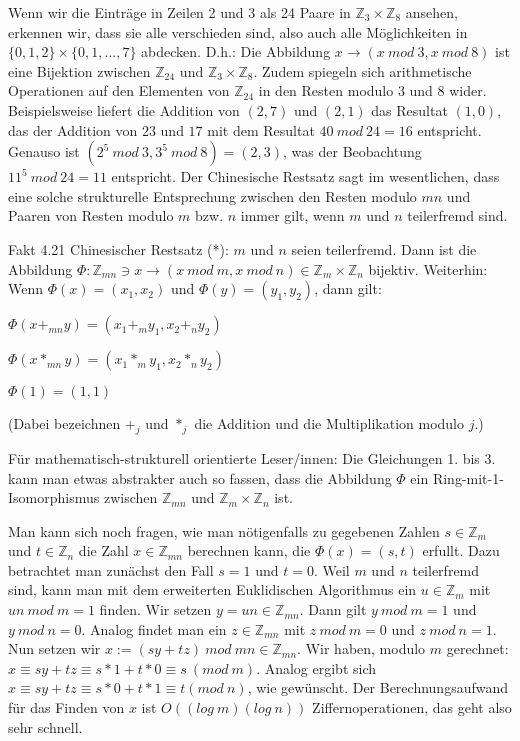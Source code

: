 \documentclass[a4paper]{article}
\begin{document}
\begin{multicols}{3}
    Wenn wir die Einträge in Zeilen 2 und 3 als 24 Paare in $\mathbb{Z}_3 \times\mathbb{Z}_8$ ansehen, erkennen wir, dass sie alle verschieden sind, also auch alle Möglichkeiten in $\{0,1,2\}\times\{0,1,...,7\}$ abdecken. D.h.: Die Abbildung $x\rightarrow (x\ mod\ 3,x\ mod\ 8)$ ist eine Bijektion zwischen $\mathbb{Z}_{24}$ und $\mathbb{Z}_3\times\mathbb{Z}_8$. Zudem spiegeln sich arithmetische Operationen auf den Elementen von $\mathbb{Z}_{24}$ in den Resten modulo $3$ und $8$ wider. Beispielsweise liefert die Addition von $(2,7)$ und $(2,1)$ das Resultat $(1,0)$, das der Addition von $23$ und $17$ mit dem Resultat $40\ mod\ 24 = 16$ entspricht. Genauso ist $(2^5\ mod\ 3, 3^5\ mod\ 8)=(2,3)$, was der Beobachtung $11^5\ mod\ 24 = 11$ entspricht.
    Der Chinesische Restsatz sagt im wesentlichen, dass eine solche strukturelle Entsprechung zwischen den Resten modulo $mn$ und Paaren von Resten modulo $m$ bzw. $n$ immer gilt, wenn $m$ und $n$ teilerfremd sind.

    Fakt 4.21 Chinesischer Restsatz (*): $m$ und $n$ seien teilerfremd. Dann ist die Abbildung $\Phi:\mathbb{Z}_{mn} \owns x \rightarrow (x\ mod\ m, x\ mod\ n)\in\mathbb{Z}_m\times\mathbb{Z}_n$ bijektiv. Weiterhin: Wenn $\Phi(x)=(x_1,x_2)$ und $\Phi(y)=(y_1,y_2)$, dann gilt:
    \begin{enumerate*}
        \item $\Phi(x+_{mn} y) = (x_1 +_m y_1 , x_2 +_n y_2)$
        \item $\Phi(x*_{mn} y) = (x_1 *_m y_1 , x_2 *_n y_2)$
        \item $\Phi(1) = (1,1)$
    \end{enumerate*}

    (Dabei bezeichnen $+_j$ und $*_j$ die Addition und die Multiplikation modulo $j$.)

    Für mathematisch-strukturell orientierte Leser/innen: Die Gleichungen 1. bis 3. kann man etwas abstrakter auch so fassen, dass die Abbildung $\Phi$ ein Ring-mit-1-Isomorphismus zwischen $\mathbb{Z}_{mn}$ und $\mathbb{Z}_m \times\mathbb{Z}_n$ ist.

    Man kann sich noch fragen, wie man nötigenfalls zu gegebenen Zahlen $s\in\mathbb{Z}_m$ und $t\in\mathbb{Z}_n$ die Zahl $x\in\mathbb{Z}_{mn}$ berechnen kann, die $\Phi(x)=(s,t)$ erfullt. Dazu betrachtet man zunächst den Fall $s=1$ und $t=0$. Weil $m$ und $n$ teilerfremd sind, kann man mit dem erweiterten Euklidischen Algorithmus ein $u\in\mathbb{Z}_{m}$ mit $un\ mod\ m=1$
    finden. Wir setzen $y=un\in\mathbb{Z}_{mn}$. Dann gilt $y\ mod\ m=1$ und $y\ mod\ n=0$. Analog findet man ein $z\in\mathbb{Z}_{mn}$ mit $z\ mod\ m=0$ und $z\ mod\ n=1$. Nun setzen wir $x:=(sy+tz)\ mod\ mn\in\mathbb{Z}_{mn}$. Wir haben, modulo $m$ gerechnet: $x\equiv sy+tz\equiv s*1+t* 0 \equiv s\ (mod\ m)$. Analog ergibt sich $x\equiv sy+tz\equiv s*0+t*1 \equiv t(mod\ n)$, wie gewünscht. Der Berechnungsaufwand für das Finden von $x$ ist $O((log\ m)(log\ n))$ Ziffernoperationen, das geht also sehr schnell.


\end{multicols}
\end{document}
